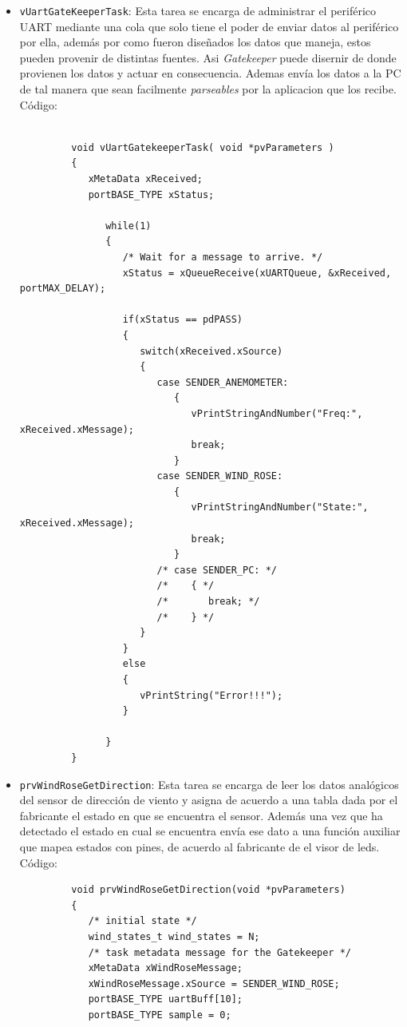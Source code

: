 \documentclass[10pt]{article}
\begin{document}
\begin{itemize}
\begin{verbatim}
         }
      \end{verbatim}
   \item \verb|vUartGateKeeperTask|: Esta tarea se encarga de administrar el periférico UART mediante una cola que solo tiene el poder de enviar datos al periférico por ella, además por como fueron diseñados los datos que maneja, estos pueden provenir de distintas fuentes. Asi \textit{Gatekeeper} puede disernir de donde provienen los datos y actuar en consecuencia. Ademas envía los datos a la PC de tal manera que sean facilmente \textit{parseables} por la aplicacion que los recibe. Código:
      \begin{verbatim}

         void vUartGatekeeperTask( void *pvParameters )
         {
            xMetaData xReceived;
            portBASE_TYPE xStatus;

               while(1)
               {
                  /* Wait for a message to arrive. */
                  xStatus = xQueueReceive(xUARTQueue, &xReceived, portMAX_DELAY);

                  if(xStatus == pdPASS)
                  {
                     switch(xReceived.xSource)
                     {
                        case SENDER_ANEMOMETER:
                           {
                              vPrintStringAndNumber("Freq:", xReceived.xMessage);
                              break;
                           }
                        case SENDER_WIND_ROSE:
                           {
                              vPrintStringAndNumber("State:", xReceived.xMessage);
                              break;
                           }
                        /* case SENDER_PC: */
                        /*    { */
                        /*       break; */
                        /*    } */
                     }
                  }
                  else
                  {
                     vPrintString("Error!!!");
                  }

               }
         }
      \end{verbatim}
   \item \verb|prvWindRoseGetDirection|: Esta tarea se encarga de leer los datos analógicos del sensor de dirección de viento y asigna de acuerdo a una tabla dada por el fabricante el estado en que se encuentra el sensor. Además una vez que ha detectado el estado en cual se encuentra envía ese dato a una función auxiliar que mapea estados con pines, de acuerdo al fabricante de el visor de leds. Código:
      \begin{verbatim}
         void prvWindRoseGetDirection(void *pvParameters)
         {
            /* initial state */
            wind_states_t wind_states = N;
            /* task metadata message for the Gatekeeper */
            xMetaData xWindRoseMessage;
            xWindRoseMessage.xSource = SENDER_WIND_ROSE;
            portBASE_TYPE uartBuff[10];
            portBASE_TYPE sample = 0;


\end{verbatim}
\end{itemize}
\end{document}
